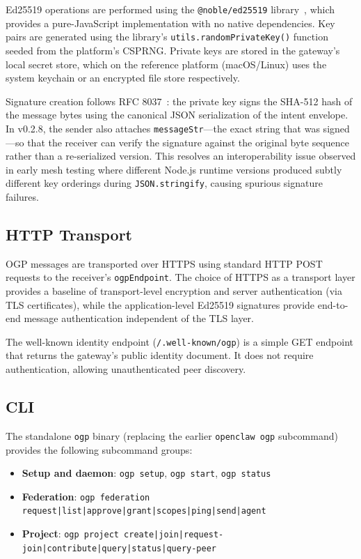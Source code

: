 \documentclass[conference]{IEEEtran}
\begin{document}
Ed25519 operations are performed using the \texttt{@noble/ed25519} library~\cite{noble}, which provides a pure-JavaScript implementation with no native dependencies. Key pairs are generated using the library's \texttt{utils.randomPrivateKey()} function seeded from the platform's CSPRNG. Private keys are stored in the gateway's local secret store, which on the reference platform (macOS/Linux) uses the system keychain or an encrypted file store respectively.

Signature creation follows RFC 8037~\cite{rfc8037}: the private key signs the SHA-512 hash of the message bytes using the canonical JSON serialization of the intent envelope. In v0.2.8, the sender also attaches \texttt{messageStr}---the exact string that was signed---so that the receiver can verify the signature against the original byte sequence rather than a re-serialized version. This resolves an interoperability issue observed in early mesh testing where different Node.js runtime versions produced subtly different key orderings during \texttt{JSON.stringify}, causing spurious signature failures.

\subsection{HTTP Transport}

OGP messages are transported over HTTPS using standard HTTP POST requests to the receiver's \texttt{ogpEndpoint}. The choice of HTTPS as a transport layer provides a baseline of transport-level encryption and server authentication (via TLS certificates), while the application-level Ed25519 signatures provide end-to-end message authentication independent of the TLS layer.

The well-known identity endpoint (\texttt{/.well-known/ogp}) is a simple GET endpoint that returns the gateway's public identity document. It does not require authentication, allowing unauthenticated peer discovery.

\subsection{CLI}

The standalone \texttt{ogp} binary (replacing the earlier \texttt{openclaw ogp} subcommand) provides the following subcommand groups:

\begin{itemize}
  \item \textbf{Setup and daemon}: \texttt{ogp setup}, \texttt{ogp start}, \texttt{ogp status}
  \item \textbf{Federation}: \texttt{ogp federation request|list|approve|grant|scopes|ping|send|agent}
  \item \textbf{Project}: \texttt{ogp project create|join|request-join|contribute|query|status|query-peer}
\end{itemize}
\end{document}
